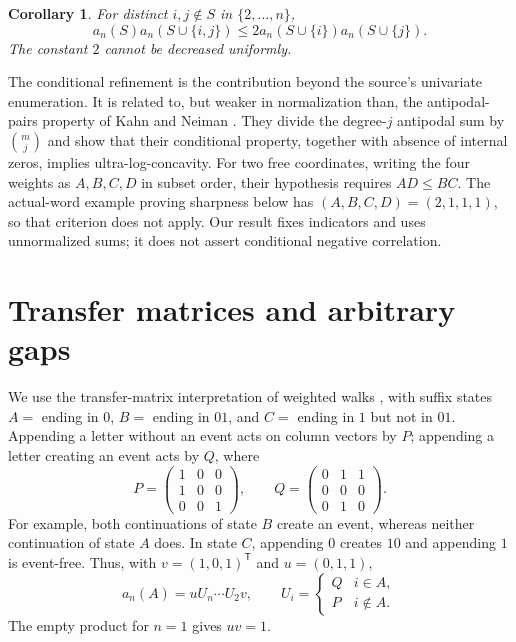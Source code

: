 \documentclass[11pt]{article}
\newtheorem{corollary}[theorem]{Corollary}
\begin{document}
\begin{corollary}\label{cor:sharp}
For distinct $i,j\notin S$ in $\{2,\ldots,n\}$,
\begin{equation}\label{eq:sharp}
 a_n(S)a_n(S\cup\{i,j\})
 \le2a_n(S\cup\{i\})a_n(S\cup\{j\}).
\end{equation}
The constant $2$ cannot be decreased uniformly.
\end{corollary}

The conditional refinement is the contribution beyond the source's
univariate enumeration. It is related to, but weaker in normalization than,
the antipodal-pairs property of Kahn and Neiman
\cite[equation~(1) and Theorem~1]{KN}. They divide the degree-$j$
antipodal sum by $\binom mj$ and show that their conditional property,
together with absence of internal zeros, implies ultra-log-concavity.
For two free coordinates, writing the four weights as $A,B,C,D$ in
subset order, their hypothesis requires $AD\le BC$.
The actual-word example proving sharpness below has $(A,B,C,D)=(2,1,1,1)$,
so that criterion does not apply. Our result fixes indicators and uses
unnormalized sums; it does not assert conditional negative correlation.

\section{Transfer matrices and arbitrary gaps}

We use the transfer-matrix interpretation of weighted walks
\cite[Section~4.7, Theorem~4.7.1]{StanleyEC1}, with suffix states
$A=$ ending in $0$, $B=$ ending in $01$, and
$C=$ ending in $1$ but not in $01$.
Appending a letter without an event acts on column vectors by $P$;
appending a letter creating an event acts by $Q$, where
\begin{equation}\label{eq:PQ}
 P=\begin{pmatrix}1&0&0\\1&0&0\\0&0&1\end{pmatrix},\qquad
 Q=\begin{pmatrix}0&1&1\\0&0&0\\0&1&0\end{pmatrix}.
\end{equation}
For example, both continuations of state $B$ create an event, whereas
neither continuation of state $A$ does. In state $C$, appending $0$
creates $10$ and appending $1$ is event-free. Thus, with
$v=(1,0,1)^{\mathsf T}$ and $u=(0,1,1)$,
\begin{equation}\label{eq:count}
 a_n(A)=uU_n\cdots U_2v,\qquad
 U_i=\begin{cases}Q&i\in A,\\P&i\notin A.\end{cases}
\end{equation}
The empty product for $n=1$ gives $uv=1$.
\end{document}
